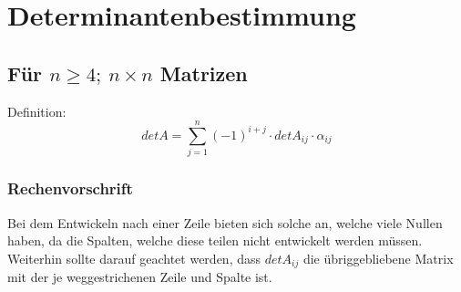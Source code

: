 \section{Determinantenbestimmung}
\subsection{Für $n \geq 4 ;\ n\times n$ Matrizen} \newline
\newline
\hspace*{10mm}%
Definition: \[detA = \sum_{j=1}^{n}(-1)^{i+j}\cdot detA_{ij}\cdot\alpha_{ij} \] \newline
\newline
\subsubsection{Rechenvorschrift}
 Bei dem Entwickeln nach einer Zeile bieten sich solche an, welche viele Nullen haben, da die Spalten, welche diese teilen nicht entwickelt werden müssen.
 Weiterhin sollte darauf geachtet werden, dass $detA_{ij}$ die übriggebliebene Matrix mit der je weggestrichenen Zeile und Spalte ist.

